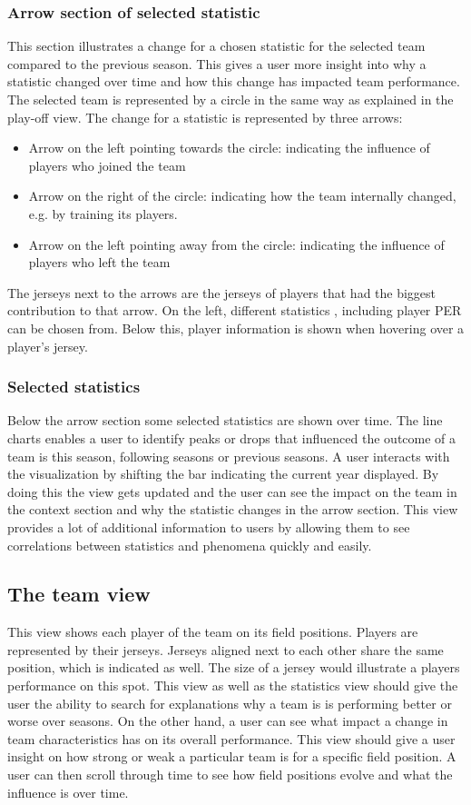 \documentclass[chi_draft]{sigchi}
\begin{document}
\subsubsection{Arrow section of selected statistic}
This section illustrates a change for a chosen statistic for the selected team
compared to the previous season. This gives a user more insight into why a
statistic changed over time and how this change has impacted team performance.
The selected team is represented by a circle in the same way as explained in the
play-off view. The change for a statistic is represented by three arrows:
\begin{itemize}
    \item Arrow on the left pointing towards the circle: indicating the
        influence of players who joined the team 
    \item Arrow on the right of the circle: indicating how the team internally
        changed, e.g. by training its players.
    \item Arrow on the left pointing away from the circle: indicating the
        influence of players who left the team 
\end{itemize}
The jerseys next to the arrows are the jerseys of players that had the biggest
contribution to that arrow. On the left, different statistics , including player
PER can be chosen from. Below this, player information is shown when hovering
over a player's jersey. 

\subsubsection{Selected statistics}
Below the arrow section some selected statistics are shown over
time.  The line charts enables a user to identify peaks or drops that
influenced the outcome of a team is this season, following seasons or previous
seasons. A user interacts with the visualization by shifting the bar indicating
the current year displayed. By doing this the view gets updated and the user can
see the impact on the team in the context section and why the statistic changes
in the arrow section. This view provides a lot of additional information to
users by allowing them to see correlations between statistics and phenomena
quickly and easily.

\subsection{The team view}
This view shows each player of the team on its field positions. Players are
represented by their jerseys. Jerseys aligned next to each other share the same
position, which is indicated as well. The size of a jersey would illustrate a
players performance on this spot. This view as well as the statistics view
should give the user the ability to search for explanations why a team is is
performing better or worse over seasons. On the other hand, a user can see what
impact a change in team characteristics has on its overall performance. This
view should give a user insight on how strong or weak a particular team is for a
specific field position. A user can then scroll through time to see how field
positions evolve and what the influence is over time.
\end{document}
